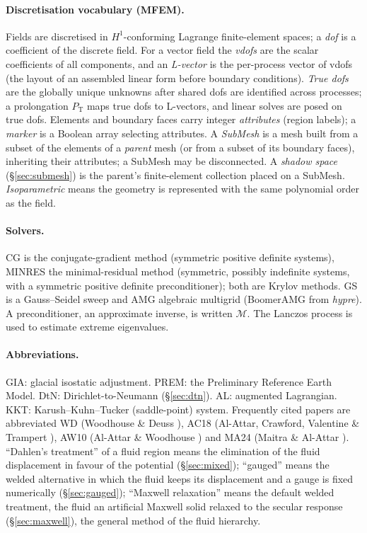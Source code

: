 \documentclass[11pt]{article}
\numberwithin{equation}{section}
\theoremstyle{remark}
\begin{document}
\paragraph{Discretisation vocabulary (MFEM).} Fields are discretised in
$H^1$-conforming Lagrange finite-element spaces; a \emph{dof} is a
coefficient of the discrete field. For a vector field the \emph{vdofs} are
the scalar coefficients of all components, and an \emph{L-vector} is the
per-process vector of vdofs (the layout of an assembled linear form before
boundary conditions). \emph{True dofs} are the globally unique unknowns
after shared dofs are identified across processes; a prolongation
$P_{\mathrm{T}}$ maps true dofs to L-vectors, and linear solves are posed
on true dofs. Elements and boundary faces carry integer
\emph{attributes} (region labels); a \emph{marker} is a Boolean array
selecting attributes. A \emph{SubMesh} is a mesh built from a subset of
the elements of a \emph{parent} mesh (or from a subset of its boundary
faces), inheriting their attributes; a SubMesh may be disconnected. A
\emph{shadow space} (\S\ref{sec:submesh}) is the parent's finite-element
collection placed on a SubMesh. \emph{Isoparametric} means the geometry is
represented with the same polynomial order as the field.

\paragraph{Solvers.} CG is the conjugate-gradient method (symmetric
positive definite systems), MINRES the minimal-residual method (symmetric,
possibly indefinite systems, with a symmetric positive definite
preconditioner); both are Krylov methods. GS is a Gauss--Seidel sweep and
AMG algebraic multigrid (BoomerAMG from \emph{hypre}). A preconditioner, an
approximate inverse, is written $\mathcal{M}$. The Lanczos process is used
to estimate extreme eigenvalues.

\paragraph{Abbreviations.} GIA: glacial isostatic adjustment. PREM: the
Preliminary Reference Earth Model. DtN: Dirichlet-to-Neumann
(\S\ref{sec:dtn}). AL: augmented Lagrangian. KKT: Karush--Kuhn--Tucker
(saddle-point) system. Frequently cited papers are abbreviated WD
(Woodhouse \& Deuss \cite{WoodhouseDeuss2007}), AC18 (Al-Attar, Crawford,
Valentine \& Trampert \cite{AC18}), AW10 (Al-Attar \& Woodhouse
\cite{AW10}) and MA24 (Maitra \& Al-Attar \cite{MaitraAlAttar2024}).
``Dahlen's treatment'' of a fluid region means the elimination of the
fluid displacement in favour of the potential (\S\ref{sec:mixed});
``gauged'' means the welded alternative in which the fluid keeps its
displacement and a gauge is fixed numerically (\S\ref{sec:gauged});
``Maxwell relaxation'' means the default welded treatment, the fluid an
artificial Maxwell solid relaxed to the secular response
(\S\ref{sec:maxwell}), the general method of the fluid hierarchy.
\end{document}
